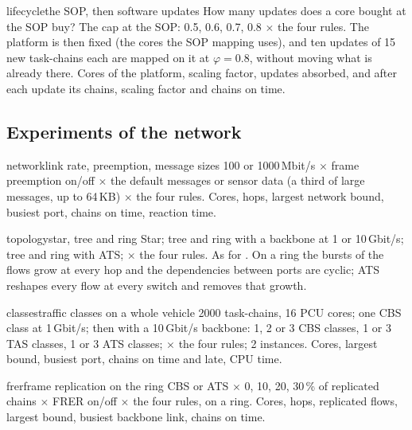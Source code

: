 \begin{experimentbox}{lifecycle}{the SOP, then software updates}
 How many updates does a core bought at the SOP buy?
 The cap at the SOP: 0.5, 0.6, 0.7, 0.8 $\times$ the four
rules. The platform is then fixed (the cores the SOP mapping uses), and
ten updates of 15 new task-chains each are mapped on it at $\varphi =
0.8$, without moving what is already there.
 Cores of the platform, scaling factor, updates absorbed,
and after each update its chains, scaling factor and chains on time.
\end{experimentbox}

\subsection{Experiments of the network}

\begin{experimentbox}{network}{link rate, preemption, message sizes}
 100 or 1000\,Mbit/s $\times$ frame preemption on/off
$\times$ the default messages or sensor data (a third of large messages, up
to 64\,KB) $\times$ the four rules.
 Cores, hops, largest network bound, busiest port, chains
on time, reaction time.
\end{experimentbox}

\begin{experimentbox}{topology}{star, tree and ring}
 Star; tree and ring with a backbone at 1 or 10\,Gbit/s;
tree and ring with ATS; $\times$ the four rules.
 As for .
 On a ring the bursts of the flows grow at every hop and
the dependencies between ports are cyclic; ATS reshapes every flow at every
switch and removes that growth.
\end{experimentbox}

\begin{experimentbox}{classes}{traffic classes on a whole vehicle}
 2000 task-chains, 16 PCU cores; one CBS class at
1\,Gbit/s; then with a 10\,Gbit/s backbone: 1, 2 or 3 CBS classes, 1 or 3
TAS classes, 1 or 3 ATS classes; $\times$ the four rules; 2 instances.
 Cores, largest bound, busiest port, chains on time and
late, CPU time.
\end{experimentbox}

\begin{experimentbox}{frer}{frame replication on the ring}
 CBS or ATS $\times$ 0, 10, 20, 30\,\% of replicated chains
$\times$ FRER on/off $\times$ the four rules, on a ring.
 Cores, hops, replicated flows, largest bound, busiest
backbone link, chains on time.
\end{experimentbox}

